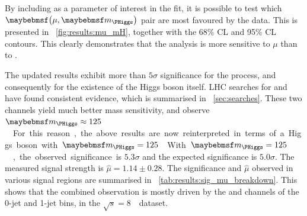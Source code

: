 By including \mH as a parameter of interest in the fit, it is possible 
to test which $\parenths{\mu, \mH}$ pair are most favoured by the data. This is presented in 
\Figure~\ref{fig:results:mu_mH}, together with the 68\% CL and 95\% CL contours. This 
clearly demonstrates that the analysis is more sensitive to $\mu$ than to \mH.

The updated results exhibit more than $5\sigma$ significance for the \ggHWWlvlv process, and 
consequently for the existence of the Higgs boson itself. LHC searches for 
\HepProcess{\PHiggs \HepTo \Pphoton\Pphoton} and \HepProcess{\PHiggs \HepTo \PZ\PZ} have 
found consistent evidence, which is summarised in \Section~\ref{sec:searches}. These two 
channels yield much better mass sensitivity, and observe \unit{$\mH \approx 125$}{\GeV}. 
For this reason, the above results are now reinterpreted in terms of a Higgs boson with 
\unit{$\mH = 125$}{\GeV}.

With \unit{$\mH = 125$}{\GeV}, the observed significance is $5.3\sigma$ and the expected 
significance is $5.0\sigma$. The measured signal strength is $\hat{\mu} = 1.14 \pm 0.28$. 
The significance and $\hat{\mu}$ observed in various signal regions are summarised in 
\Table~\ref{tab:results:sig_mu_breakdown}. This shows that the combined observation is 
mostly driven by the \emch and \mech channels of the 0-jet and 1-jet bins, in the 
\unit{$\sqrt{s} = 8$}{\TeV} dataset.

